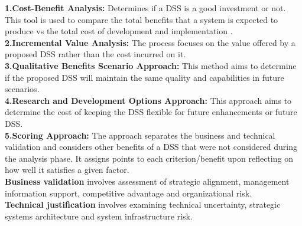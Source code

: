 \textbf{1.Cost-Benefit Analysis:} Determines if a DSS is a good investment or not. This tool is used to compare the total benefits that a system is expected to produce vs the total cost of development and implementation .\cite{DSS} \\
\textbf{2.Incremental Value Analysis:} The process focuses on the value offered by a proposed DSS rather than the cost incurred on it.\cite{DSS}\\
\textbf{3.Qualitative Benefits Scenario Approach:} This method aims to determine if the proposed DSS will maintain the same quality and capabilities in future scenarios.\cite{DSS}\\
\textbf{4.Research and Development Options Approach:} This approach aims to determine the cost of keeping the DSS flexible for future enhancements or future DSS.\cite{DSS} \\
\textbf{5.Scoring Approach:} The approach separates the business and technical validation and considers other benefits of a DSS that were not considered during the analysis phase. It assigns points to each criterion/benefit upon reflecting on how well it satisfies a given factor.\\
\indent \textbf{Business validation} involves assessment of strategic alignment, management information support, competitive advantage and organizational risk.\cite{DSS} \\
\indent \textbf{Technical justification} involves examining technical uncertainty, strategic systems architecture and system infrastructure risk.\cite{DSS}